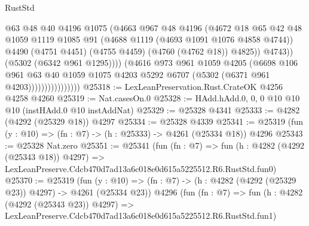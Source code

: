 \begin{lexlean}{RustStd}
\begin{coremodule}
                                    @63
                                    @48
                                    @40
                                    @4196
                                    @1075
                                    (@4663
                                      @967
                                      @48
                                      @4196
                                      (@4672
                                        @18
                                        @65
                                        @42
                                        @48
                                        @1059
                                        @1119
                                        @1085
                                        @91
                                        (@4688 @1119 (@4693 @1091 @1076 @4858 @4744))
                                        @4490
                                        (@4751 @4451)
                                        (@4755 @4459)
                                        (@4760 (@4762 @18))
                                        @4825))
                                    @4743))
                                (@5302 (@6342 @961 @1295))))
                            (@4616
                              @973
                              @961
                              @1059
                              @4205
                              (@6698
                                @106
                                @961
                                @63
                                @40
                                @1059
                                @1075
                                @4203
                                @5292
                                @6707
                                (@5302 (@6371 @961 @4203))))))))))))))))
@25318 := LexLeanPreservation.Rust.CrateOK @4256 @4258 @4260
@25319 := Nat.casesOn.{0}
@25328 := HAdd.hAdd.{0, 0, 0} @10 @10 @10 (instHAdd.{0} @10 instAddNat)
@25329 := @25328 @4341
@25333 := @4282 (@4292 (@25329 @18)) @4297
@25334 := @25328 @4339
@25341 := @25319 (fun (y : @10) => (fn : @7) -> (h : @25333) -> @4261 (@25334 @18)) @4296
@25343 := @25328 Nat.zero
@25351 := @25341
    (fun (fn : @7) =>
    fun (h : @4282 (@4292 (@25343 @18)) @4297) =>
    LexLeanPreserve.Cdcb470d7ad13a6c018e0d615a5225512.R6.RustStd.fun0)
@25370 := @25319
    (fun (y : @10) => (fn : @7) -> (h : @4282 (@4292 (@25329 @23)) @4297) -> @4261 (@25334 @23))
    @4296
    (fun (fn : @7) =>
    fun (h : @4282 (@4292 (@25343 @23)) @4297) =>
    LexLeanPreserve.Cdcb470d7ad13a6c018e0d615a5225512.R6.RustStd.fun1)

\end{coremodule}
\end{lexlean}
